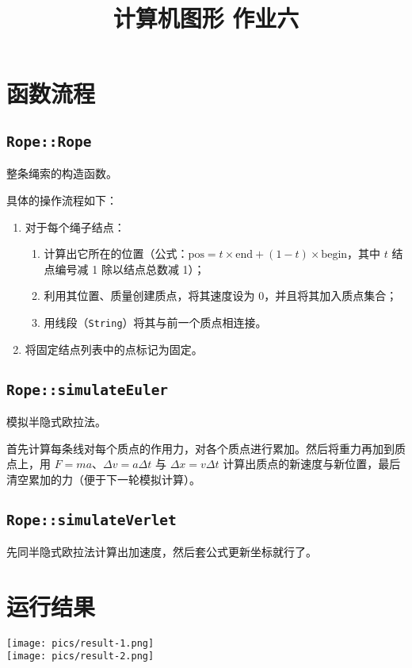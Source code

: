 \documentclass{ctexart}
\title{计算机图形 作业六}
\author{\theauthor}
\begin{document}
    \maketitle

    \section{函数流程}

    \subsection{\texttt{Rope::Rope}}

    整条绳索的构造函数。

    具体的操作流程如下：
    \begin{enumerate}
        \item 对于每个绳子结点：
        \begin{enumerate}
            \item 计算出它所在的位置（公式：$\mathrm{pos} = t \times \mathrm{end} + (1 - t) \times \mathrm{begin}$，其中 $t$ 结点编号减 1 除以结点总数减 1）；
            \item 利用其位置、质量创建质点，将其速度设为 0，并且将其加入质点集合；
            \item 用线段（\texttt{String}）将其与前一个质点相连接。
        \end{enumerate}
        \item 将固定结点列表中的点标记为固定。
    \end{enumerate}

    \subsection{\texttt{Rope::simulateEuler}}

    模拟半隐式欧拉法。

    首先计算每条线对每个质点的作用力，对各个质点进行累加。然后将重力再加到质点上，用 $F = ma$、$\Delta v = a \Delta t$ 与 $\Delta x = v \Delta t$ 计算出质点的新速度与新位置，最后清空累加的力（便于下一轮模拟计算）。

    \subsection{\texttt{Rope::simulateVerlet}}

    先同半隐式欧拉法计算出加速度，然后套公式更新坐标就行了。

    \section{运行结果}

    \begin{center}
        \texttt{[image: pics/result-1.png]} \\
        \texttt{[image: pics/result-2.png]}
    \end{center}
\end{document}
